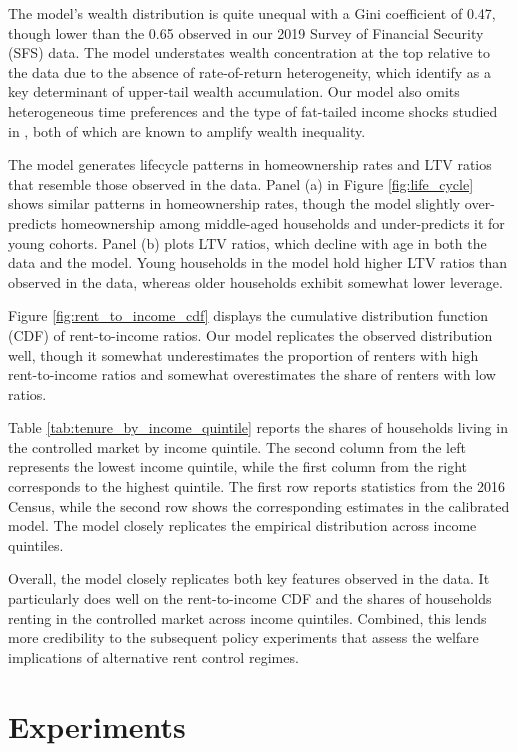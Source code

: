 \documentclass[parskip=full]{article}
\begin{document}
The model's wealth distribution is quite unequal with a Gini coefficient of 0.47, though lower than the 0.65 observed in our 2019 Survey of Financial Security (SFS) data. The model understates wealth concentration at the top relative to the data due to the absence of rate-of-return heterogeneity, which \citet{fagereng} identify as a key determinant of upper-tail wealth accumulation. Our model also omits heterogeneous time preferences \citep{ks-1998} and the type of fat-tailed income shocks studied in \citet{mj-shocks}, both of which are known to amplify wealth inequality.

The model generates lifecycle patterns in homeownership rates and LTV ratios that resemble those observed in the data. Panel (a) in Figure \ref{fig:life_cycle} shows similar patterns in homeownership rates, though the model slightly over-predicts homeownership among middle-aged households and under-predicts it for young cohorts. Panel (b) plots LTV ratios, which decline with age in both the data and the model. Young households in the model hold higher LTV ratios than observed in the data, whereas older households exhibit somewhat lower leverage.

Figure \ref{fig:rent_to_income_cdf} displays the cumulative distribution function (CDF) of rent-to-income ratios. Our model replicates the observed distribution well, though it somewhat underestimates the proportion of renters with high rent-to-income ratios and somewhat overestimates the share of renters with low ratios.

Table \ref{tab:tenure_by_income_quintile} reports the shares of households living in the controlled market by income quintile. The second column from the left represents the lowest income quintile, while the first column from the right corresponds to the highest quintile. The first row reports statistics from the 2016 Census, while the second row shows the corresponding estimates in the calibrated model. The model closely replicates the empirical distribution across income quintiles.

Overall, the model closely replicates both key features observed in the data. It particularly does well on the rent-to-income CDF and the shares of households renting in the controlled market across income quintiles. Combined, this lends more credibility to the subsequent policy experiments that assess the welfare implications of alternative rent control regimes.

\section{Experiments}\label{section:experiments}
\end{document}
